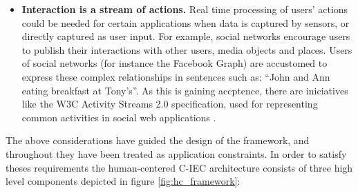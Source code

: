 \begin{itemize}
\item {\bf Interaction is a stream of actions.}
  Real time processing of users' actions could be needed for certain applications when data is 
  captured by sensors, or directly captured as user input. For example, social networks encourage
  users to publish their interactions with other users, media objects and places. Users of 
  social networks (for instance the Facebook Graph) are accustomed to express these 
  complex relationships in sentences such as: ``John and Ann eating breakfast at Tony's''. 
  As this is gaining accptence, there are iniciatives like the W3C Activity Streams 2.0 
  specification, used for representing common activities in social 
  web applications \cite{json:streams}. 
\end{itemize}

The above considerations have guided the design of the framework, and throughout they have been
treated as application constraints. In order to satisfy theses requirements the
human-centered C-IEC architecture consists of three high level components depicted
in figure \ref{fig:hc_framework}:

